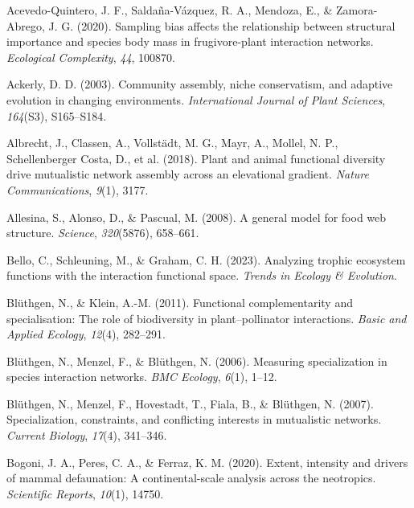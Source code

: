 \documentclass[
]{agujournal2019}
\newlength{\cslhangindent}
\newenvironment{CSLReferences}[2] %
 {\begin{list}{}{%
  \setlength{\itemindent}{0pt}
  \setlength{\leftmargin}{0pt}
  \setlength{\parsep}{0pt}
  \ifodd #1
   \setlength{\leftmargin}{\cslhangindent}
   \setlength{\itemindent}{-1\cslhangindent}
  \fi
  \setlength{\itemsep}{#2\baselineskip}}}
 {\end{list}}
\begin{document}
\label{refs}
\begin{CSLReferences}{1}{0}
Acevedo-Quintero, J. F., Saldaña-Vázquez, R. A., Mendoza, E., \&
Zamora-Abrego, J. G. (2020). Sampling bias affects the relationship
between structural importance and species body mass in frugivore-plant
interaction networks. \emph{Ecological Complexity}, \emph{44}, 100870.

Ackerly, D. D. (2003). Community assembly, niche conservatism, and
adaptive evolution in changing environments. \emph{International Journal
of Plant Sciences}, \emph{164}(S3), S165--S184.

Albrecht, J., Classen, A., Vollstädt, M. G., Mayr, A., Mollel, N. P.,
Schellenberger Costa, D., et al. (2018). Plant and animal functional
diversity drive mutualistic network assembly across an elevational
gradient. \emph{Nature Communications}, \emph{9}(1), 3177.

Allesina, S., Alonso, D., \& Pascual, M. (2008). A general model for
food web structure. \emph{Science}, \emph{320}(5876), 658--661.

Bello, C., Schleuning, M., \& Graham, C. H. (2023). Analyzing trophic
ecosystem functions with the interaction functional space. \emph{Trends
in Ecology \& Evolution}.

Blüthgen, N., \& Klein, A.-M. (2011). Functional complementarity and
specialisation: The role of biodiversity in plant--pollinator
interactions. \emph{Basic and Applied Ecology}, \emph{12}(4), 282--291.

Blüthgen, N., Menzel, F., \& Blüthgen, N. (2006). Measuring
specialization in species interaction networks. \emph{BMC Ecology},
\emph{6}(1), 1--12.

Blüthgen, N., Menzel, F., Hovestadt, T., Fiala, B., \& Blüthgen, N.
(2007). Specialization, constraints, and conflicting interests in
mutualistic networks. \emph{Current Biology}, \emph{17}(4), 341--346.

Bogoni, J. A., Peres, C. A., \& Ferraz, K. M. (2020). Extent, intensity
and drivers of mammal defaunation: A continental-scale analysis across
the neotropics. \emph{Scientific Reports}, \emph{10}(1), 14750.


\end{CSLReferences}
\end{document}
